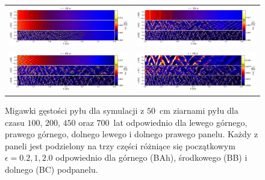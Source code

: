 %
\begin{figure}
   \centering
   \begin{tabular}{@{}cc@{}}
      \includegraphics[width=0.49\linewidth]{figures/fig1a} & 
      \includegraphics[width=0.49\linewidth]{figures/fig1b} \\
      \includegraphics[width=0.49\linewidth]{figures/fig1c} &
      \includegraphics[width=0.49\linewidth]{figures/fig1d}
   \end{tabular}
   \caption{Migawki gęstości pyłu dla symulacji z $50$~cm ziarnami pyłu
      dla czasu $100$, $200$, $450$ oraz $700$~lat odpowiednio dla lewego
      górnego, prawego górnego, dolnego lewego i dolnego prawego panelu.
      Każdy z paneli jest podzielony na trzy części różniące się początkowym 
      $\epsilon = 0.2, 1, 2.0$ odpowiednio dla górnego (BAh), środkowego (BB) i
      dolnego (BC) podpanelu.}
   \label{fig1}
\end{figure}
%
